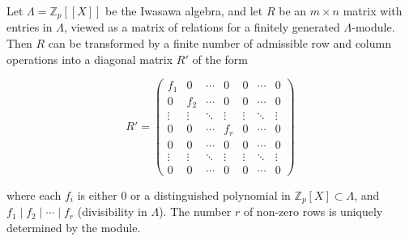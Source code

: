 Let $\Lambda = \mathbb{Z}_p[[X]]$ be the Iwasawa algebra, and let $R$ be an $m \times n$ matrix with entries in $\Lambda$, viewed as a matrix of relations for a finitely generated $\Lambda$-module. Then $R$ can be transformed by a finite number of admissible row and column operations into a diagonal matrix $R'$ of the form

$$
R' = \begin{pmatrix}
f_1 & 0 & \cdots & 0 & 0 & \cdots & 0 \\
0 & f_2 & \cdots & 0 & 0 & \cdots & 0 \\
\vdots & \vdots & \ddots & \vdots & \vdots & \ddots & \vdots \\
0 & 0 & \cdots & f_r & 0 & \cdots & 0 \\
0 & 0 & \cdots & 0 & 0 & \cdots & 0 \\
\vdots & \vdots & \ddots & \vdots & \vdots & \ddots & \vdots \\
0 & 0 & \cdots & 0 & 0 & \cdots & 0
\end{pmatrix}
$$

where each $f_i$ is either $0$ or a distinguished polynomial in $\mathbb{Z}_p[X] \subset \Lambda$, and $f_1 \mid f_2 \mid \cdots \mid f_r$ (divisibility in $\Lambda$). The number $r$ of non-zero rows is uniquely determined by the module.
